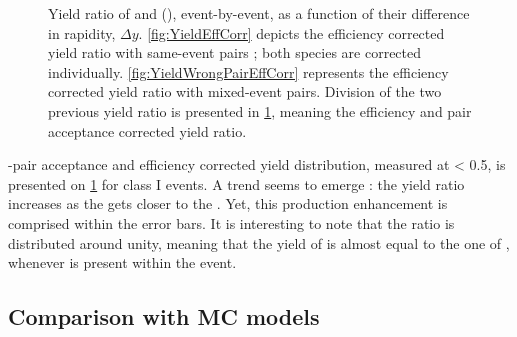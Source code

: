 \begin{figure}[h]
\begin{subfigure}[b]{.45\linewidth}
         \caption{ }
         \label{fig:YieldPair+EffCorr} 
    \end{subfigure}
\caption{Yield ratio of \rmPhiMes and (\rmOmegas), event-by-event, as a function of their difference in rapidity, $\Delta y$. \fig \ref{fig:YieldEffCorr} depicts the efficiency corrected yield ratio with same-event pairs ; both species are corrected individually. \fig \ref{fig:YieldWrongPairEffCorr} represents the efficiency corrected yield ratio with mixed-event pairs. Division of the two previous yield ratio is presented in \fig \ref{fig:YieldPair+EffCorr}, meaning the efficiency and pair acceptance corrected yield ratio.}
	\label{fig:Yield}
\end{figure}


\rmPhiMes-\rmOmegaPM pair acceptance and efficiency corrected yield distribution, measured at \absrap < 0.5, is presented on \fig \ref{fig:YieldPair+EffCorr} for class I events. A trend seems to emerge : the yield ratio increases as the \rmPhiMes gets closer to the \rmOmegaPM. Yet, this production enhancement is comprised within the error bars. It is interesting to note that the ratio is distributed around unity, meaning that the yield of \rmPhiMes is almost equal to the one of \rmOmega, whenever \rmOmega is present within the event.

\subsection{Comparison with MC models}
\label{sec:Section06.b-}
